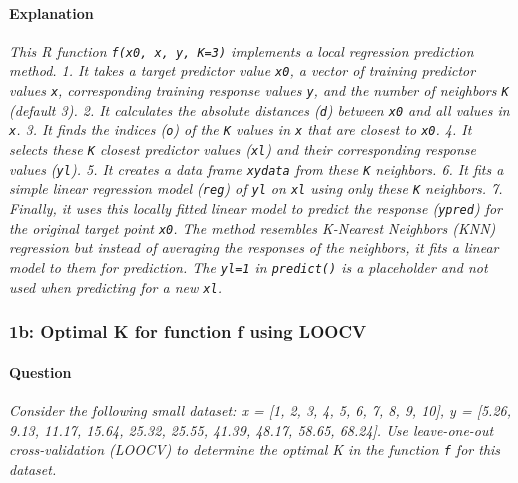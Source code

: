 \documentclass[12pt,a4paper]{article}
\newcommand{\Rfunction}[1]{\texttt{#1()}} %
\newcommand{\Rcode}[1]{\texttt{#1}} %
\begin{document}
        \paragraph{Explanation}
        \textit{
        This R function \Rcode{f(x0, x, y, K=3)} implements a local regression prediction method.
        1. It takes a target predictor value \Rcode{x0}, a vector of training predictor values \Rcode{x}, corresponding training response values \Rcode{y}, and the number of neighbors \Rcode{K} (default 3).
        2. It calculates the absolute distances (\Rcode{d}) between \Rcode{x0} and all values in \Rcode{x}.
        3. It finds the indices (\Rcode{o}) of the \Rcode{K} values in \Rcode{x} that are closest to \Rcode{x0}.
        4. It selects these \Rcode{K} closest predictor values (\Rcode{xl}) and their corresponding response values (\Rcode{yl}).
        5. It creates a data frame \Rcode{xydata} from these \Rcode{K} neighbors.
        6. It fits a simple linear regression model (\Rcode{reg}) of \Rcode{yl} on \Rcode{xl} using only these \Rcode{K} neighbors.
        7. Finally, it uses this locally fitted linear model to predict the response (\Rcode{ypred}) for the original target point \Rcode{x0}.
        The method resembles K-Nearest Neighbors (KNN) regression but instead of averaging the responses of the neighbors, it fits a linear model to them for prediction. The \Rcode{yl=1} in \Rfunction{predict} is a placeholder and not used when predicting for a new \Rcode{xl}.
        }

    \subsubsection{1b: Optimal K for function f using LOOCV}
        \paragraph{Question}
        \textit{Consider the following small dataset: x = [1, 2, 3, 4, 5, 6, 7, 8, 9, 10], y = [5.26, 9.13, 11.17, 15.64, 25.32, 25.55, 41.39, 48.17, 58.65, 68.24]. Use leave-one-out cross-validation (LOOCV) to determine the optimal K in the function \Rcode{f} for this dataset.}
\end{document}
